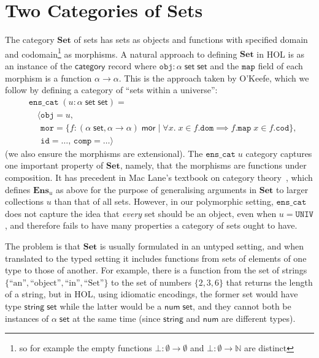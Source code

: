 \documentclass[twoside,titlepage,11pt]{article}
\begin{document}
\section{Two Categories of Sets}%
\label{Set}
\newcommand{\Set}{\ensuremath{\mathbf{Set}}}
The category $\Set$ of sets has sets as objects and functions with specified domain and codomain\footnote{so for example the empty functions $\bot:\emptyset\to\emptyset$ and $\bot:\emptyset\to\mathbb{N}$ are distinct} as morphisms.
A natural approach to defining $\Set$ in HOL is as an instance of the $\mathsf{category}$ record where $\mathtt{obj}:\alpha\;\mathsf{set}\;\mathsf{set}$ and the $\mathtt{map}$ field of each morphism is a function $\alpha\to\alpha$.
This is the approach taken by O'Keefe, which we follow by defining a category of ``sets within a universe'':
\begin{align*}
&\mathtt{ens\_cat}\;(u:\alpha\;\mathsf{set}\;\mathsf{set})=\\
&\quad\langle\mathtt{obj}=u,\\
&\quad\phantom{\langle}\mathtt{mor}=\{f:(\alpha\;\mathsf{set},\alpha\to\alpha)\;\mathsf{mor}\mid \forall{x}.\;x\in f.\mathtt{dom}\implies f.\mathtt{map}\;x\in f.\mathtt{cod}\},\\
&\quad\phantom{\langle}\mathtt{id}=\dots,\,\mathtt{comp}=\dots\rangle
\end{align*}
(we also ensure the morphisms are extensional).
The $\mathtt{ens\_cat}\;u$ category captures one important property of $\Set$, namely, that the morphisms are functions under composition.
It has precedent in Mac Lane's textbook on category theory~\cite{MacLaneCFTWM}, which defines $\mathbf{Ens}_u$ as above for the purpose of generalising arguments in $\Set$ to larger collections $u$ than that of all sets.
However, in our polymorphic setting, $\mathtt{ens\_cat}$ does not capture the idea that \emph{every} set should be an object, even when $u=\mathtt{UNIV}$, and therefore fails to have many properties a category of sets ought to have.

The problem is that $\Set$ is usually formulated in an untyped setting, and when translated to the typed setting it includes functions from sets of elements of one type to those of another.
For example, there is a function from the set of strings $\{\text{``an''},\text{``object''},\text{``in''},\text{``Set''}\}$ to the set of numbers $\{2,3,6\}$ that returns the length of a string, but in HOL, using idiomatic encodings, the former set would have type $\mathsf{string}\;\mathsf{set}$ while the latter would be a $\mathsf{num}\;\mathsf{set}$, and they cannot both be instances of $\alpha\;\mathsf{set}$ at the same time (since $\mathsf{string}$ and $\mathsf{num}$ are different types).
\end{document}
